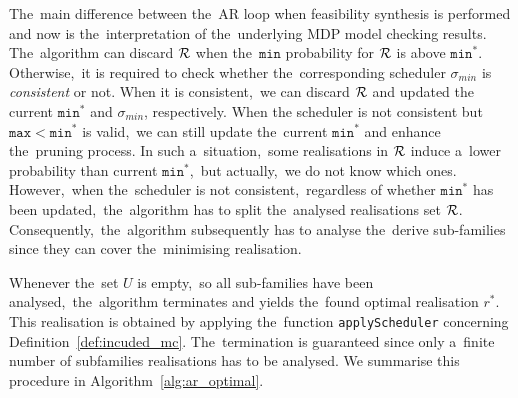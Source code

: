 The~main difference between the~AR loop when feasibility synthesis is performed and now is the~interpretation of the~underlying MDP model checking results.
The~algorithm can discard $\mathcal{R}$ when the~$\mathtt{min}$ probability for $\mathcal{R}$ is above $\mathtt{min^*}$.
Otherwise,~it is required to check whether the~corresponding scheduler $\sigma_{min}$ is \textit{consistent} or not.
When it is consistent,~we can discard $\mathcal{R}$ and updated the current $\mathtt{min^*}$ and $\sigma_{min}$, respectively.
When the scheduler is not consistent but $\mathtt{max < min^*}$ is valid,~we can still update the~current $\mathtt{min^*}$ and enhance the~pruning process.
In such a~situation,~some realisations in $\mathcal{R}$ induce a~lower probability than current $\mathtt{min^*}$,~but actually,~we do not know which ones.
However,~when the~scheduler is not consistent,~regardless of whether $\mathtt{min^*}$ has been updated,~the~algorithm has to split the~analysed realisations set $\mathcal{R}$.
Consequently,~the~algorithm subsequently has to analyse the~derive sub-families since they can cover the~minimising realisation.

Whenever the~set $U$ is empty,~so all sub-families have been analysed,~the~algorithm terminates and yields the~found optimal realisation $r^*$.
This realisation is obtained by applying the~function \texttt{applyScheduler} concerning Definition~\ref{def:incuded_mc}.
The~termination is guaranteed since only a~finite number of subfamilies realisations has to be analysed.
We summarise this procedure in Algorithm~\ref{alg:ar_optimal}.

